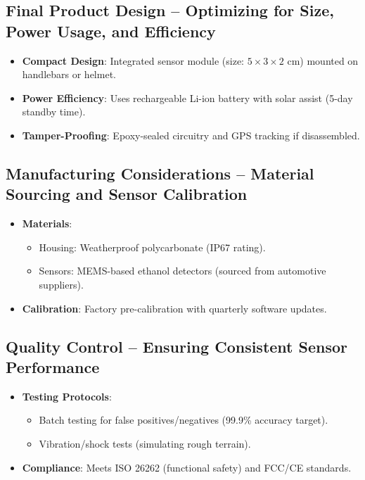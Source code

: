 \documentclass{article}
\begin{document}
\subsection{Final Product Design -- Optimizing for Size, Power Usage, and Efficiency}
\begin{itemize}
    \item \textbf{Compact Design}: Integrated sensor module (size: $5 \times 3 \times 2$ cm) mounted on handlebars or helmet.
    \item \textbf{Power Efficiency}: Uses rechargeable Li-ion battery with solar assist (5-day standby time).
    \item \textbf{Tamper-Proofing}: Epoxy-sealed circuitry and GPS tracking if disassembled.
\end{itemize}

\subsection{Manufacturing Considerations -- Material Sourcing and Sensor Calibration}
\begin{itemize}
    \item \textbf{Materials}:
    \begin{itemize}
        \item Housing: Weatherproof polycarbonate (IP67 rating).
        \item Sensors: MEMS-based ethanol detectors (sourced from automotive suppliers).
    \end{itemize}
    \item \textbf{Calibration}: Factory pre-calibration with quarterly software updates.
\end{itemize}

\subsection{Quality Control -- Ensuring Consistent Sensor Performance}
\begin{itemize}
    \item \textbf{Testing Protocols}:
    \begin{itemize}
        \item Batch testing for false positives/negatives (99.9\% accuracy target).
        \item Vibration/shock tests (simulating rough terrain).
    \end{itemize}
    \item \textbf{Compliance}: Meets ISO 26262 (functional safety) and FCC/CE standards.
\end{itemize}
\end{document}
